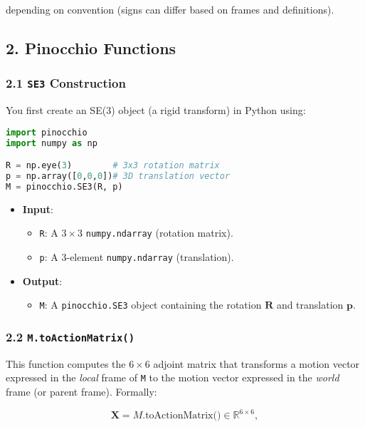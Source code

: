 \documentclass[10pt]{article}
\begin{document}
depending on convention (signs can differ based on frames and definitions).

\subsection*{2. Pinocchio Functions}

\subsubsection*{2.1 \texttt{SE3} Construction}

You first create an SE(3) object (a rigid transform) in Python using:

\begin{lstlisting}[language=Python]
import pinocchio
import numpy as np

R = np.eye(3)        # 3x3 rotation matrix
p = np.array([0,0,0])# 3D translation vector
M = pinocchio.SE3(R, p)
\end{lstlisting}

\begin{itemize}
  \item \textbf{Input}:
    \begin{itemize}
      \item \texttt{R}: A \(3\times3\) \texttt{numpy.ndarray} (rotation matrix).
      \item \texttt{p}: A 3-element \texttt{numpy.ndarray} (translation).
    \end{itemize}
  \item \textbf{Output}: 
    \begin{itemize}
      \item \texttt{M}: A \texttt{pinocchio.SE3} object containing the rotation \(\mathbf{R}\) and translation \(\mathbf{p}\).
    \end{itemize}
\end{itemize}

\subsubsection*{2.2 \texttt{M.toActionMatrix()}}

This function computes the \(6\times6\) adjoint matrix that transforms a motion vector expressed in the \emph{local} frame of \texttt{M} to the motion vector expressed in the \emph{world} frame (or parent frame). Formally:

\[
\mathbf{X} = M.\text{toActionMatrix()} \in \mathbb{R}^{6\times 6},
\]
\end{document}
